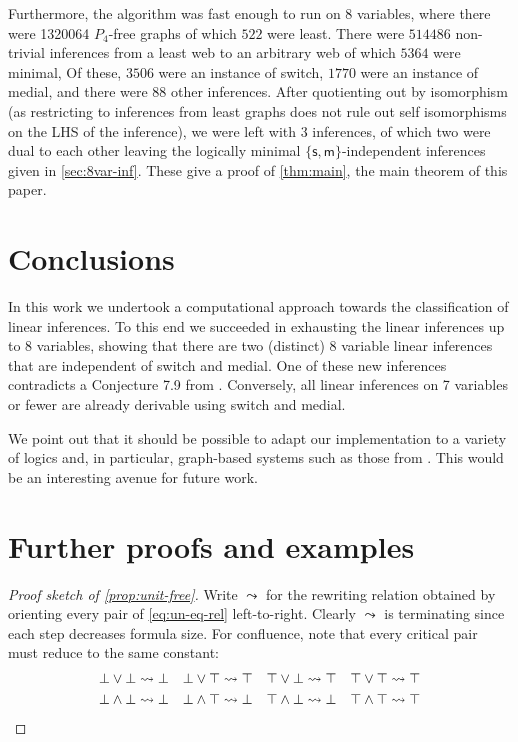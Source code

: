 \documentclass[a4paper, UKenglish, cleveref]{lipics-v2021}
\newcommand{\m}{\ensuremath{\mathsf{m}}}
\newcommand{\s}{\ensuremath{\mathsf{s}}}
\begin{document}
Furthermore, the algorithm was fast enough to run on 8 variables, where there were 1320064 \(P_4\)-free graphs of which \(522\) were least. There were \(514486\) non-trivial inferences from a least web to an arbitrary web of which \(5364\) were minimal, Of these, \(3506\) were an instance of switch, \(1770\) were an instance of medial, and there were \(88\) other inferences. After quotienting out by isomorphism (as restricting to inferences from least graphs does not rule out self isomorphisms on the LHS of the inference), we were left with \(3\) inferences, of which two were dual to each other leaving the logically minimal $\{\s,\m\}$-independent inferences given in \cref{sec:8var-inf}. These give a proof of \cref{thm:main}, the main theorem of this paper.



\section{Conclusions}
\label{sec:conclusions}
In this work we undertook a computational approach towards the classification of linear inferences.
To this end we succeeded in exhausting the linear inferences up to 8 variables, showing that there are two (distinct) 8 variable linear inferences that are independent of switch and medial.
One of these new inferences contradicts a Conjecture 7.9 from \cite{DasStr16:no-compl-lin-sys}.
Conversely, all linear inferences on 7 variables or fewer are already derivable using switch and medial.


We point out that it should be possible to adapt our implementation to a variety of logics and, in particular, graph-based systems such as those from \cite{AccHorStr20:mll-graphs-short,AccHorStr20:mll-graphs-full,CalDasWar20:bgl}.
This would be an interesting avenue for future work.

%
%
%
%




\appendix

\section{Further proofs and examples}
\label{sect:app:further-proofs-examples}

\begin{proof}
[Proof sketch of \cref{prop:unit-free}]
Write $\leadsto$ for the rewriting relation obtained by orienting every pair of \eqref{eq:un-eq-rel} left-to-right.
Clearly $\leadsto$ is terminating since each step decreases formula size.
For confluence, note that every critical pair must reduce to the same constant:
\begin{equation*}
\begin{alignedat}{4}
&\bot \lor \bot \leadsto \bot &\quad& \bot \lor \top \leadsto \top &\quad& \top \lor \bot \leadsto \top &\quad& \top \lor \top \leadsto \top \\
&\bot \land \bot \leadsto \bot && \bot \land \top \leadsto \bot && \top \land \bot \leadsto \bot && \top \land \top \leadsto \top
\end{alignedat}\qedhere
\end{equation*}
\end{proof}
\end{document}
